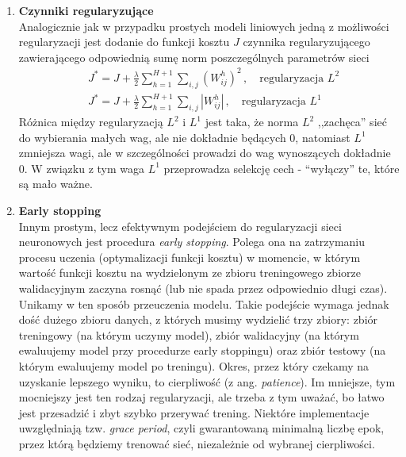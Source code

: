 \documentclass{myclass}
\begin{document}
\begin{enumerate}
    \item \textbf{Czynniki regularyzujące}\\
    Analogicznie jak w przypadku prostych modeli liniowych jedną z możliwości regularyzacji jest
    dodanie do funkcji kosztu \(J\) czynnika regularyzującego zawierającego odpowiednią sumę norm
    poszczególnych parametrów sieci
    \begin{equation*}
        \begin{split}
            &J^* = J + \frac{\lambda}{2}\sum_{h=1}^{H+1}\sum_{i,j} \left(W_{ij}^h\right)^2\,,\quad\text{regularyzacja \(L^2\)}\\
            &J^* = J + \frac{\lambda}{2}\sum_{h=1}^{H+1}\sum_{i,j} \left|W_{ij}^h\right|\,,\quad\text{regularyzacja \(L^1\)}
        \end{split}
    \end{equation*}
    Różnica między regularyzacją \(L^2\) i \(L^1\) jest taka, że norma \(L^2\) ,,zachęca” sieć do
    wybierania małych wag, ale nie dokładnie będących 0, natomiast \(L^1\) zmniejsza wagi, ale w
    szczególności prowadzi do wag wynoszących dokładnie 0. W związku z tym waga \(L^1\) przeprowadza
    selekcję cech - “wyłączy” te, które są mało ważne.

    \item \textbf{Early stopping}\\
    Innym prostym, lecz efektywnym podejściem do regularyzacji sieci neuronowych jest procedura
    \textit{early stopping}. Polega ona na zatrzymaniu procesu uczenia (optymalizacji funkcji
    kosztu) w momencie, w którym wartość funkcji kosztu na wydzielonym ze zbioru treningowego
    zbiorze walidacyjnym zaczyna rosnąć (lub nie spada przez odpowiednio długi czas). Unikamy w ten
    sposób przeuczenia modelu. Takie podejście wymaga jednak dość dużego zbioru danych, z których
    musimy wydzielić trzy zbiory: zbiór treningowy (na którym uczymy model), zbiór walidacyjny (na
    którym ewaluujemy model przy procedurze early stoppingu) oraz zbiór testowy (na którym
    ewaluujemy model po treningu). Okres, przez który czekamy na uzyskanie lepszego wyniku, to
    cierpliwość (z ang. \textit{patience}). Im mniejsze, tym mocniejszy jest ten rodzaj
    regularyzacji, ale trzeba z tym uważać, bo łatwo jest przesadzić i zbyt szybko przerywać
    trening. Niektóre implementacje uwzględniają tzw. \textit{grace period}, czyli gwarantowaną
    minimalną liczbę epok, przez którą będziemy trenować sieć, niezależnie od wybranej cierpliwości.


\end{enumerate}
\end{document}
